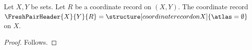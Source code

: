 

\begin{construction}\label{fresh_pair_header}
    Let $X,Y$ be sets.
    Let $R$ be a coordinate record on $(X,Y)$.
    The coordinate record $\FreshPairHeader{X}{Y}{R}=
        \structure[coordinate record on X]{\atlas=\emptyset}$ on $X$.
\end{construction}
\begin{proof}
    Follows.
\end{proof}
